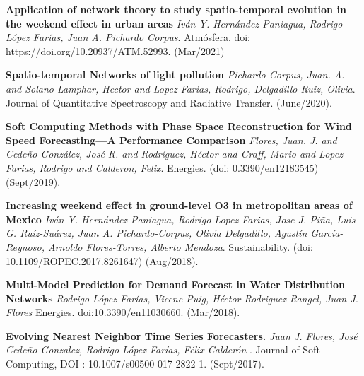 \documentclass[10pt]{article}
\newenvironment{innerlist}[1][\enskip\textbullet]%
        {\begin{compactitem}[#1]}{\end{compactitem}}
\begin{document}
\begin{innerlist}
\item \textbf{Application of network theory to study spatio-temporal evolution in
the weekend effect in urban areas} \textit{Iván Y. Hernández-Paniagua, Rodrigo López Farías, Juan A. Pichardo Corpus}. Atmósfera. doi: https://doi.org/10.20937/ATM.52993. (Mar/2021)

\item \textbf{Spatio-temporal Networks of light pollution} \textit{{Pichardo Corpus, Juan. A. and Solano-Lamphar, Hector and Lopez-Farias, Rodrigo, Delgadillo-Ruiz, Olivia}}. {Journal of Quantitative Spectroscopy and Radiative Transfer}. ({June/2020}).

\item \textbf{Soft Computing Methods with Phase Space Reconstruction for Wind Speed Forecasting—A Performance Comparison} \textit{{Flores, Juan. J. and Cedeño González, José R. and Rodríguez, Héctor and Graff, Mario and Lopez-Farias, Rodrigo and Calderon, Felix}}. {Energies}. (doi: 0.3390/en12183545) ({Sept/2019}).

\item \textbf{Increasing weekend effect in ground-level O3 in metropolitan areas of Mexico} \textit{Iván Y. Hernández-Paniagua, Rodrigo Lopez-Farias, Jose J. Piña, Luis G. Ruíz-Suárez, Juan A. Pichardo-Corpus, Olivia Delgadillo, Agustín García-Reynoso, Arnoldo Flores-Torres, Alberto Mendoza}. {Sustainability}. (doi: 10.1109/ROPEC.2017.8261647) ({Aug/2018}).

\item \textbf{Multi-Model Prediction for Demand Forecast in
Water Distribution Networks} \textit{Rodrigo López Farías, Vicenc Puig, Héctor Rodriguez Rangel, Juan J. Flores} {Energies}. doi:10.3390/en11030660. ({Mar/2018}).

\item  \textbf{Evolving Nearest Neighbor Time Series Forecasters.} \textit{Juan J. Flores, José Cede\~no Gonzalez, Rodrigo López Farías, Félix Calderón }.  {Journal of Soft Computing},
DOI : 10.1007/s00500-017-2822-1. (Sept/2017).


\end{innerlist}
\end{document}
